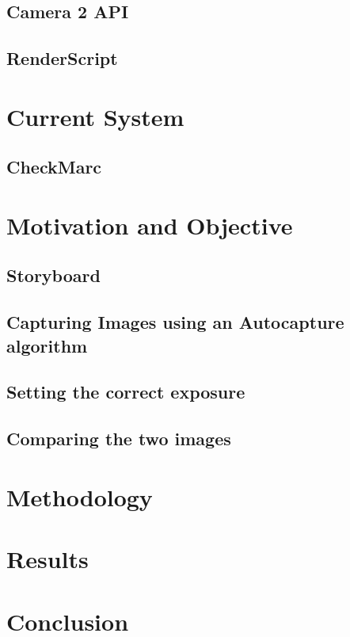 \documentclass[12pt]{dalcsthesis}
\begin{document}
\section{Camera 2 API}
\section{RenderScript}
\chapter{Current System}
\section{CheckMarc}
\chapter{Motivation and Objective}
\section{Storyboard}
\section{Capturing Images using an Autocapture algorithm}
\section{Setting the correct exposure}
\section{Comparing the two images}
\chapter{Methodology}
\chapter{Results}
\chapter{Conclusion}




\end{document}
